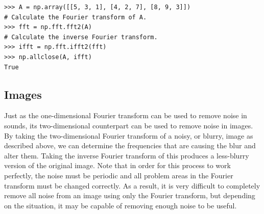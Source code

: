 \begin{lstlisting}
>>> A = np.array([[5, 3, 1], [4, 2, 7], [8, 9, 3]])
# Calculate the Fourier transform of A.
>>> fft = np.fft.fft2(A)
# Calculate the inverse Fourier transform.
>>> ifft = np.fft.ifft2(fft)
>>> np.allclose(A, ifft)
True
\end{lstlisting}

\subsection*{Images}

Just as the one-dimensional Fourier transform can be used to remove noise in sounds, its two-dimensional counterpart can be used to remove noise in images.
By taking the two-dimensional Fourier transform of a noisy, or blurry, image as described above, we can determine the frequencies that are causing the blur and alter them. 
Taking the inverse Fourier transform of this produces a less-blurry version of the original image.
Note that in order for this process to work perfectly, the noise must be periodic and all problem areas in the Fourier transform must be changed correctly.
As a result, it is very difficult to completely remove all noise from an image using only the Fourier transform, but depending on the situation, it may be capable of removing enough noise to be useful.

